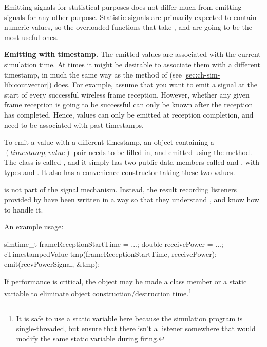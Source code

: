 Emitting signals for statistical purposes does not differ much from
emitting signals for any other purpose. Statistic signals are primarily
expected to contain numeric values, so the overloaded  functions
that take ,  and  are going to be the
most useful ones.

\textbf{Emitting with timestamp.} The emitted values are associated with
the current simulation time. At times it might be desirable to associate
them with a different timestamp, in much the same way as the
 method of  (see
\ref{sec:ch-sim-lib:coutvector}) does. For example, assume that you want to
emit a signal at the start of every successful wireless frame reception.
However, whether any given frame reception is going to be successful can
only be known after the reception has completed. Hence, values can only be
emitted at reception completion, and need to be associated with past
timestamps.

To emit a value with a different timestamp, an object containing
a $(timestamp, value)$ pair needs to be filled in, and emitted using
the  method. The class is called
, and it simply has two public data members called
 and , with types  and .
It also has a convenience constructor taking these two values.

\begin{note}
 is not part of the signal mechanism. Instead,
the result recording listeners provided by {\opp} have been written
in a way so that they understand , and know how
to handle it.
\end{note}

An example usage:

\begin{cpp}
simtime_t frameReceptionStartTime = ...;
double receivePower = ...;
cTimestampedValue tmp(frameReceptionStartTime, receivePower);
emit(recvPowerSignal, &tmp);
\end{cpp}

If performance is critical, the  object may be
made a class member or a static variable to eliminate object
construction/destruction time.\footnote{It is safe to use a static
variable here because the simulation program is single-threaded,
but ensure that there isn't a listener somewhere that would modify
the same static variable during firing.}

